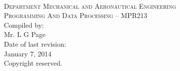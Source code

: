 \begin{titlepage}
    \thispagestyle{empty}
    \begin{center}
        \ \\
        \vspace{2cm}
        {\Large \textsc{Department Mechanical and Aeronautical
                        Engineering}} \\
        \vspace{1.5cm}
        {\huge \textsc{Programming And Data Processing -- MPR213}} \\
        \vspace{3cm}
        {\large Compiled by:} \\
        \vspace{0.2cm}
        {\large Mr. L G Page} \\
        \vspace{1cm}
        {\large Date of last revision:} \\
        \vspace{0.2cm}
        {\large January 7, 2014} \\
        \vspace{1cm}
        {\large Copyright reserved.} \\
    \end{center}
\end{titlepage}
